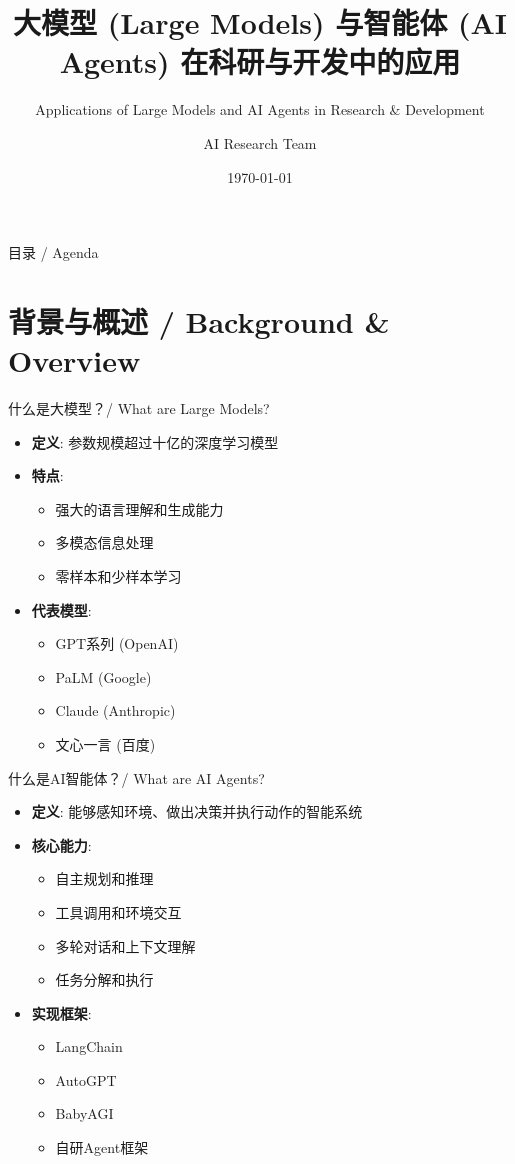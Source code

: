 \documentclass[aspectratio=169]{beamer}
\title{大模型 (Large Models) 与智能体 (AI Agents) 在科研与开发中的应用}
\subtitle{Applications of Large Models and AI Agents in Research \& Development}
\author{AI Research Team}
\institute{科研机构}
\date{\today}
\begin{document}
\frame{\titlepage}

\begin{frame}{目录 / Agenda}
\tableofcontents
\end{frame}

\section{背景与概述 / Background \& Overview}

\begin{frame}{什么是大模型？/ What are Large Models?}
\begin{itemize}
    \item \textbf{定义}: 参数规模超过十亿的深度学习模型
    \item \textbf{特点}: 
        \begin{itemize}
            \item 强大的语言理解和生成能力
            \item 多模态信息处理
            \item 零样本和少样本学习
        \end{itemize}
    \item \textbf{代表模型}:
        \begin{itemize}
            \item GPT系列 (OpenAI)
            \item PaLM (Google)
            \item Claude (Anthropic)
            \item 文心一言 (百度)
        \end{itemize}
\end{itemize}
\end{frame}

\begin{frame}{什么是AI智能体？/ What are AI Agents?}
\begin{itemize}
    \item \textbf{定义}: 能够感知环境、做出决策并执行动作的智能系统
    \item \textbf{核心能力}:
        \begin{itemize}
            \item 自主规划和推理
            \item 工具调用和环境交互
            \item 多轮对话和上下文理解
            \item 任务分解和执行
        \end{itemize}
    \item \textbf{实现框架}:
        \begin{itemize}
            \item LangChain
            \item AutoGPT
            \item BabyAGI
            \item 自研Agent框架
        \end{itemize}
\end{itemize}
\end{frame}
\end{document}
